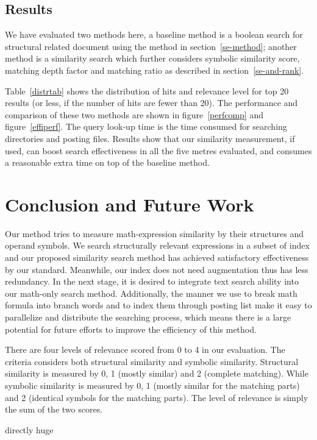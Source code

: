 \subsection{Results}
We have evaluated two methods here, a baseline method is a boolean search for structural related document using the method in section~\ref{se-method}; another method is a similarity search which further considers symbolic similarity score, matching depth factor and matching ratio as described in section~\ref{se-and-rank}.

Table~\ref{distrtab} shows the distribution of hits and relevance level for top 20 results (or less, if the number of hits are fewer than 20).
The performance and comparison of these two methods are shown in figure~\ref{perfcomp} and figure~\ref{effiperf}. 
The query look-up time is the time consumed for searching directories and posting files.
Results show that our similarity measurement, if used, can boost search effectiveness in all the five metres evaluated, 
and consumes a reasonable extra time on top of the baseline method. 

\section{Conclusion and Future Work}
Our method tries to measure math-expression similarity by their structures and operand symbols. 
We search structurally relevant expressions in a subset of index and our proposed similarity search method has achieved satisfactory effectiveness by our standard.
Meanwhile, our index does not need augmentation thus has less redundancy.
In the next stage, it is desired to integrate text search ability into our math-only search method. 
Additionally, the manner we use to break math formula into branch words and to index them through posting list make it easy to parallelize and distribute the searching process,
which means there is a large potential for future efforts to improve the efficiency of this method.

There are four levels of relevance scored from 0 to 4 in our evaluation.
The criteria considers both structural similarity and symbolic similarity. 
Structural similarity is measured by 0, 1 (mostly similar) and 2 (complete matching). 
While symbolic similarity is measured by 0, 1 (mostly similar for the matching parts) and 2 (identical symbols for the matching parts).
The level of relevance is simply the sum of the two scores.

directly huge
